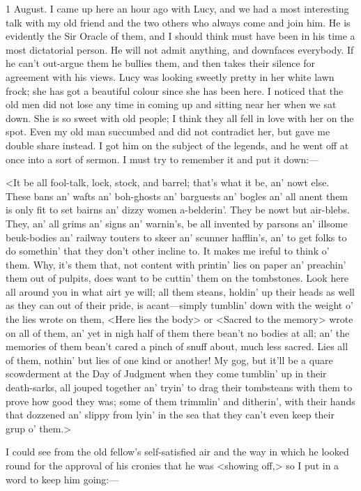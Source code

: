\begin{diary}{1 August.}
I came up here an hour ago with Lucy, and we had a most interesting talk with my old friend and the two others who always come and join him. He is evidently the Sir Oracle of them, and I should think must have been in his time a most dictatorial person. He will not admit anything, and downfaces everybody. If he can't out-argue them he bullies them, and then takes their silence for agreement with his views. Lucy was looking sweetly pretty in her white lawn frock; she has got a beautiful colour since she has been here. I noticed that the old men did not lose any time in coming up and sitting near her when we sat down. She is so sweet with old people; I think they all fell in love with her on the spot. Even my old man succumbed and did not contradict her, but gave me double share instead. I got him on the subject of the legends, and he went off at once into a sort of sermon. I must try to remember it and put it down:—

<It be all fool-talk, lock, stock, and barrel; that's what it be, an' nowt else. These bans an' wafts an' boh-ghosts an' barguests an' bogles an' all anent them is only fit to set bairns an' dizzy women a-belderin'. They be nowt but air-blebs. They, an' all grims an' signs an' warnin's, be all invented by parsons an' illsome beuk-bodies an' railway touters to skeer an' scunner hafflin's, an' to get folks to do somethin' that they don't other incline to. It makes me ireful to think o' them. Why, it's them that, not content with printin' lies on paper an' preachin' them out of pulpits, does want to be cuttin' them on the tombstones. Look here all around you in what airt ye will; all them steans, holdin' up their heads as well as they can out of their pride, is acant—simply tumblin' down with the weight o' the lies wrote on them, <Here lies the body> or <Sacred to the memory> wrote on all of them, an' yet in nigh half of them there bean't no bodies at all; an' the memories of them bean't cared a pinch of snuff about, much less sacred. Lies all of them, nothin' but lies of one kind or another! My gog, but it'll be a quare scowderment at the Day of Judgment when they come tumblin' up in their death-sarks, all jouped together an' tryin' to drag their tombsteans with them to prove how good they was; some of them trimmlin' and ditherin', with their hands that dozzened an' slippy from lyin' in the sea that they can't even keep their grup o' them.>

I could see from the old fellow's self-satisfied air and the way in which he looked round for the approval of his cronies that he was <showing off,> so I put in a word to keep him going:—


\end{diary}
